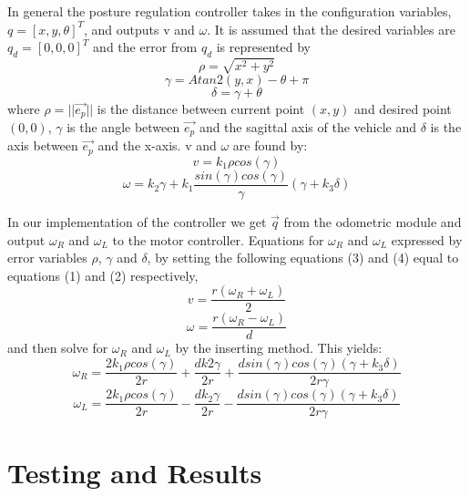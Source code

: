 \documentclass[a4paper,10pt]{article}
\begin{document}
	
		In general the posture regulation controller takes in the configuration variables, $q = [x, y, \theta]^{T}$, 
		and outputs v and $\omega$.
		It is assumed that the desired variables are $q_{d} = [0, 0, 0]^{T}$ and the error from $q_{d}$ is represented by
		\begin{equation}
			\rho = \sqrt{x^{2} + y^{2}} 
		\end{equation}
		\begin{equation}
			\gamma = Atan2(y, x) - \theta + \pi
		\end{equation}
		\begin{equation}
			\delta = \gamma + \theta
		\end{equation}
		where $\rho = ||\vec{e_{p}}||$ is the distance between current point $(x, y)$ and desired point $(0, 0)$, 
		$\gamma$ is the angle between $\vec{e_{p}}$	and the sagittal axis of the vehicle and $\delta$ is the axis between $\vec{e_{p}}$ and the x-axis.	
		v and $\omega$ are found by:
		\begin{equation}
			v = k_{1}\rho cos(\gamma)
		\end{equation}		
		\begin{equation}
			\omega = k_{2}\gamma + k_{1}\frac{sin(\gamma)cos(\gamma)}{\gamma}(\gamma + k_{3}\delta)
		\end{equation}
		
		In our implementation of the controller we get $\vec{q}$ from the odometric module and output $\omega_{R}$ and $\omega_{L}$ to the motor controller.
		Equations for $\omega_{R}$ and $\omega_{L}$ expressed by error variables $\rho$, $\gamma$ and $\delta$, 
		by setting the following equations (3) and (4) equal to equations (1) and (2) respectively, 
		\begin{equation}
			v = \frac{r(\omega_{R} + \omega_{L})}{2}
		\end{equation}
		\begin{equation}
			\omega = \frac{r(\omega_{R} - \omega_{L})}{d}
		\end{equation}
		and then solve for $\omega_{R}$ and $\omega_{L}$ by the inserting method. This yields:		
		\begin{equation}
			\omega_{R} = \frac{2k_{1}\rho cos(\gamma)}{2r} + \frac{dk{2}\gamma}{2r} + \frac{dsin(\gamma)cos(\gamma)(\gamma + k_{3}\delta)}{2r\gamma}
		\end{equation}
		\begin{equation}
			\omega_{L} = \frac{2k_{1}\rho cos(\gamma)}{2r} - \frac{dk_{2}\gamma}{2r} - \frac{dsin(\gamma)cos(\gamma)(\gamma + k_{3}\delta)}{2r\gamma}
		\end{equation}

\section{Testing and Results}
\end{document}
